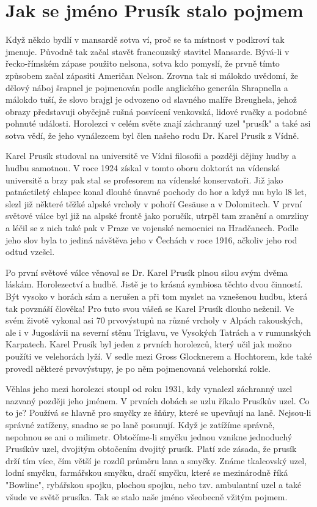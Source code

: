 \documentclass[../dejiny-rodu-prusiku.tex]{subfiles}
\begin{document}
\section{Jak se jméno Prusík stalo pojmem}
Když někdo bydlí v mansardě sotva ví, proč se ta místnost v podkroví tak jmenuje. Původně tak začal stavět francouzský stavitel Mansarde. Bývá-li v řecko-římském zápase použito nelsona, sotva kdo pomyslí, že prvně tímto způsobem začal zápasiti Američan Nelson. Zrovna tak si málokdo uvědomí, že dělový náboj šrapnel je pojmenován podle anglického generála Shrapnella a málokdo tuší, že slovo brajgl je odvozeno od slavného malíře Breughela, jehož obrazy představuji obyčejně rušná posvícení venkovská, lidové rvačky a podobné pohnuté události. Horolezci v celém světe znají záchranný uzel "prusík" a také asi sotva vědí, že jeho vynálezcem byl člen našeho rodu Dr. Karel Prusík z Vídně.

Karel Prusík studoval na universitě ve Vídni filosofii a později dějiny hudby a hudbu samotnou. V roce 1924 získal v tomto oboru doktorát na vídenské universitě a brzy pak stal se profesorem na vídenské konservatoři. Již jako patnáctiletý chlapec konal dlouhé únavné pochody do hor a když mu bylo l8 let, slezl již některé těžké alpské vrcholy v pohoří Gesäuse a v Dolomitech. V první světové válce byl již na alpské frontě jako poručík, utrpěl tam zranění a omrzliny a léčil se z nich také pak v Praze ve vojenské nemocnici na Hradčanech. Podle jeho slov byla to jediná návštěva jeho v Čechách v roce 1916, ačkoliv jeho rod odtud vzešel.

Po první světové válce věnoval se Dr. Karel Prusík plnou silou svým dvěma láskám. Horolezectví a hudbě. Jistě je to krásná symbiosa těchto dvou činností. Být vysoko v horách sám a nerušen a při tom myslet na vznešenou hudbu, která tak povznáší člověka! Pro tuto svou vášeň se Karel Prusík dlouho neženil. Ve svém životě vykonal asi 70 prvovýstupů na různé vrcholy v Alpách rakouských, ale i v Jugoslávii na severní stěnu Triglavu, ve Vysokých Tatrách a v rumunských Karpatech. Karel Prusík byl jeden z prvních horolezců, který učil jak možno použíti ve velehorách lyží. V sedle mezi Gross Glocknerem a Hochtorem, kde také provedl některé prvovýstupy, je po něm pojmenovaná velehorská rokle.

Věhlas jeho mezi horolezci stoupl od roku 1931, kdy vynalezl záchranný uzel nazvaný později jeho jménem. V prvních
dobách se uzlu říkalo Prusíkův uzel.  Co to je? Používá se hlavně pro smyčky ze šňůry, které se upevňují na laně. Nejsou-li správné zatíženy, snadno se po laně posunují. Když je zatížíme správně, nepohnou se ani o milimetr. Obtočíme-li smyčku jednou vznikne jednoduchý Prusíkův uzel, dvojitým obtočením dvojitý prusík. Platí zde zásada, že prusík drží tím více, čím větší je rozdíl průměru lana a smyčky. Známe tkalcovský uzel, lodní smyčku, farmářskou smyčku, dračí smyčku, které se mezinárodně říká "Bowline", rybářskou spojku, plochou spojku, nebo tzv. ambulantní uzel a také všude ve světě prusíka. Tak se stalo na­še jméno všeobecně vžitým pojmem.
\end{document}
